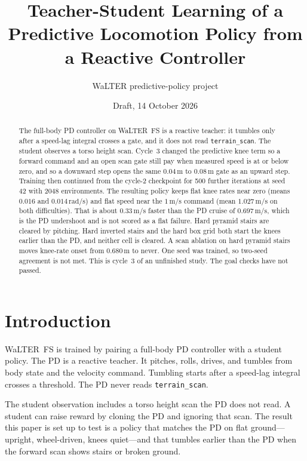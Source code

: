 \documentclass[11pt]{article}
\title{Teacher-Student Learning of a Predictive Locomotion Policy from a Reactive Controller}
\author{WaLTER predictive-policy project}
\date{Draft, 14 October 2026}
\begin{document}
\maketitle

\begin{abstract}
The full-body PD controller on WaLTER~FS is a reactive teacher: it tumbles only after a speed-lag integral crosses a gate, and it does not read \texttt{terrain\_scan}.
The student observes a torso height scan.
Cycle~3 changed the predictive knee term so a forward command and an open scan gate still pay when measured speed is at or below zero, and so a downward step opens the same \(0.04\,\mathrm{m}\) to \(0.08\,\mathrm{m}\) gate as an upward step.
Training then continued from the cycle-2 checkpoint for 500 further iterations at seed 42 with 2048 environments.
The resulting policy keeps flat knee rates near zero (means \(0.016\) and \(0.014\,\mathrm{rad/s}\)) and flat speed near the \(1\,\mathrm{m/s}\) command (mean \(1.027\,\mathrm{m/s}\) on both difficulties).
That is about \(0.33\,\mathrm{m/s}\) faster than the PD cruise of \(0.697\,\mathrm{m/s}\), which is the PD undershoot and is not scored as a flat failure.
Hard pyramid stairs are cleared by pitching.
Hard inverted stairs and the hard box grid both start the knees earlier than the PD, and neither cell is cleared.
A scan ablation on hard pyramid stairs moves knee-rate onset from \(0.680\,\mathrm{m}\) to never.
One seed was trained, so two-seed agreement is not met.
This is cycle~3 of an unfinished study.
The goal checks have not passed.
\end{abstract}

\section{Introduction}
\label{sec:introduction}

WaLTER~FS is trained by pairing a full-body PD controller with a student policy.
The PD is a reactive teacher.
It pitches, rolls, drives, and tumbles from body state and the velocity command.
Tumbling starts after a speed-lag integral crosses a threshold.
The PD never reads \texttt{terrain\_scan}.

The student observation includes a torso height scan the PD does not read.
A student can raise reward by cloning the PD and ignoring that scan.
The result this paper is set up to test is a policy that matches the PD on flat ground---upright, wheel-driven, knees quiet---and that tumbles earlier than the PD when the forward scan shows stairs or broken ground.
\end{document}
